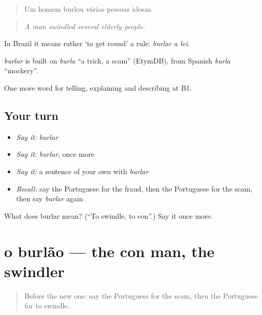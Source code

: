 \begin{quote}
Um homem burlou várias pessoas idosas.
\end{quote}

\begin{quote}
\emph{A man swindled several elderly people.}
\end{quote}

In Brazil it means rather ‘to get round’ a rule: \emph{burlar a lei}.

\begin{cousinweb}
\emph{burlar} is built on \emph{burla} \textquotedblleft{}a trick, a scam\textquotedblright{} (EtymDB), from Spanish \emph{burla} \textquotedblleft{}mockery\textquotedblright{}.
\end{cousinweb}

\begin{grammarlens}[title={What you've built}]
One more word for telling, explaining and describing at B1.
\end{grammarlens}

\subsection*{Your turn}
\begin{itemize}
\raggedright
  \item \emph{Say it:} \emph{burlar}
  \item \emph{Say it:} \emph{burlar}, once more
  \item \emph{Say it:} a sentence of your own with \emph{burlar}
  \item \emph{Recall:} say the Portuguese for the fraud, then the Portuguese for the scam, then say \emph{burlar} again
\end{itemize}

\begin{tcolorbox}[breakable,colback=teal!4,colframe=teal!35!black,title={Before you move on}]
What does burlar mean? (\textquotedblleft{}To swindle, to con\textquotedblright{}.) Say it once more.
\end{tcolorbox}
\section[o burlão]{o burlão — the con man, the swindler}

\label{lesson:PT-C289-burlao}



\begin{quote}
Before the new one: say the Portuguese for the scam, then the Portuguese for to swindle.
\end{quote}

